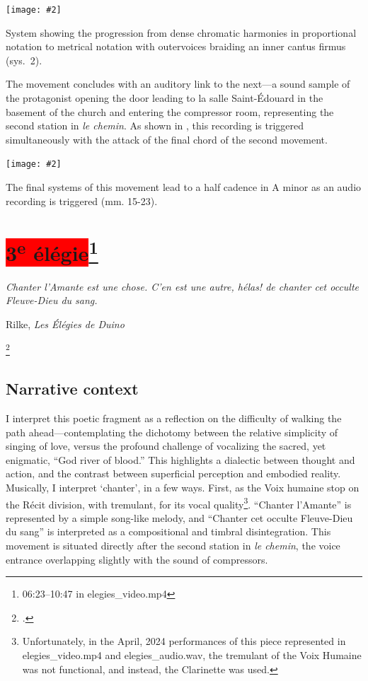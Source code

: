 \documentclass[12pt,twoside,maitrise]{dms_ks}
\newcommand{\customincludeexamples}[4][]{%
    \begin{example}[H]
        \centering
        \texttt{[image: \#2]}
        \caption{#4}
	\label{#3} 
    \end{example}
}
\theoremstyle{definition}
\begin{document}
{\customincludeexamples[width=\textwidth]{2e_2}{ex:2e_2}{System showing the progression from dense chromatic harmonies in proportional notation to metrical notation with outervoices braiding an inner cantus firmus (sys.~2).}

The movement concludes with an auditory link to the next---a sound sample of the protagonist opening the door leading to la salle Saint-Édouard in the basement of the church and entering the compressor room, representing the second station in \textit{le chemin}.
As shown in , this recording is triggered simultaneously with the attack of the final chord of the second movement.

\customincludeexamples[width=\textwidth]{2e_3}{ex:2e_3}{The final systems of this movement lead to a half cadence in A minor as an audio recording is triggered (mm. 15-23).}

\section{\colorbox{red}{3\textsuperscript{e} élégie}\footnote{06:23--10:47 in elegies\_video.mp4}}

\epigraph{\textit{Chanter l'Amante est une chose. C'en est une autre, hélas! de chanter cet occulte Fleuve-Dieu du sang.}}{Rilke, \textit{Les Élégies de Duino}\protect\footnotemark}

\footcitetext[29]{rilke_egies_1986}

\subsection{Narrative context}

I interpret this poetic fragment as a reflection on the difficulty of walking the path ahead---contemplating the dichotomy between the relative simplicity of singing of love, versus the profound challenge of vocalizing the sacred, yet enigmatic, “God river of blood.”  
This highlights a dialectic between thought and action, and the contrast between superficial perception and embodied reality.  
Musically, I interpret `chanter', in a few ways. 
First, as the Voix humaine stop on the Récit division, with tremulant, for its vocal quality\footnote{Unfortunately, in the April, 2024 performances of this piece represented in elegies\_video.mp4 and elegies\_audio.wav, the tremulant of the Voix Humaine was not functional, and instead, the Clarinette was used.}.  
“Chanter l'Amante” is represented by a simple song-like melody, and “Chanter cet occulte Fleuve-Dieu du sang” is interpreted as a compositional and timbral disintegration. 
This movement is situated directly after the second station in \textit{le chemin}, the voice entrance overlapping slightly with the sound of compressors.

}
\end{document}
